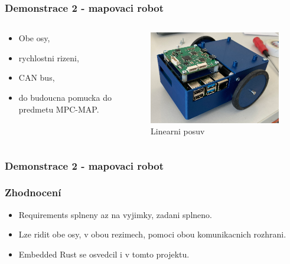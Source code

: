 \documentclass[%
  12pt,       				%
	t,                  %
	aspectratio=1610,   %
	unicode,						%
]{beamer}				    	%
\begin{document}
\begin{frame}
	\frametitle{Demonstrace 2 - mapovaci robot}
	\begin{columns}[T] 								%
		\begin{column}{0.4\textwidth}
			\begin{itemize}
				\item Obe osy,
				\item rychlostni rizeni,
				\item CAN bus,
				\item do budoucna pomucka do predmetu MPC-MAP.
			\end{itemize}
		\end{column}
		\begin{column}{0.6\textwidth}		%
			\begin{figure}%
				\centering
				\includegraphics[width=0.8\columnwidth]{../Thesis/obrazky/map_bot}
				\caption{Linearni posuv}%
				\label{fig:sm4_block}
			\end{figure}
		\end{column}
	\end{columns}
\end{frame}

\begin{frame}
	\frametitle{Demonstrace 2 - mapovaci robot}
\end{frame}

\begin{frame}
	\frametitle{Zhodnocení}
	\begin{itemize}
		\item Requirements splneny az na vyjimky, zadani splneno.
		\item Lze ridit obe osy, v obou rezimech, pomoci obou komunikacnich rozhrani.
		\item Embedded Rust se osvedcil i v tomto projektu.
	\end{itemize}
\end{frame}
\end{document}

